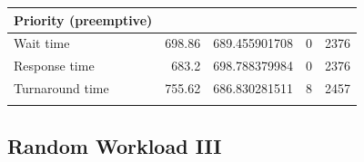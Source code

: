 \documentclass[12pt,letterpaper]{article}
\begin{document}
\begin{appendices}
\begin{table}[H]
\begin{tabular}{l r r r r}
						\\
						\textbf{Priority (preemptive)} \\
						\hline
	Wait time &		698.86 &	689.455901708 &	0 &	2376 	\\
	Response time &		683.2 &	698.788379984 &	0 &	2376 	\\
	Turnaround time &	755.62 &	686.830281511 &	8 &	2457 	\\
						\\
					\end{tabular}
					\label{table:data-rand2}
				\end{table}

			\subsection{Random Workload III}


\end{appendices}
\end{document}
